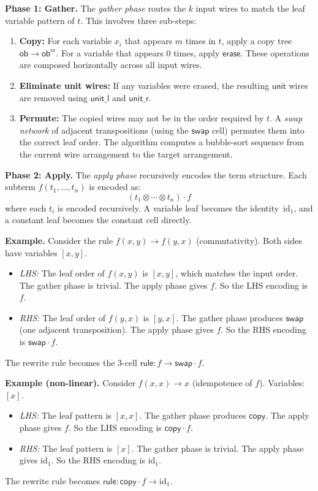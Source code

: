 \documentclass[acmsmall,screen,nonacm]{acmart}
\newcommand{\ob}{\mathsf{ob}}
\newcommand{\unit}{\mathsf{unit}}
\newcommand{\id}{\mathrm{id}}
\newcommand{\copy}{\mathsf{copy}}
\newcommand{\swap}{\mathsf{swap}}
\newcommand{\erase}{\mathsf{erase}}
\begin{document}
\medskip\noindent\textbf{Phase 1: Gather.}
The \emph{gather phase} routes the $k$ input wires to match the leaf
variable pattern of $t$.  This involves three sub-steps:
\begin{enumerate}
\item \textbf{Copy:} For each variable $x_i$ that appears $m$ times in
  $t$, apply a copy tree $\ob \to \ob^m$.  For a variable that appears
  $0$ times, apply $\erase$.  These operations are composed
  horizontally across all input wires.

\item \textbf{Eliminate unit wires:} If any variables were erased, the
  resulting $\unit$ wires are removed using $\mathsf{unit\_l}$ and
  $\mathsf{unit\_r}$.

\item \textbf{Permute:} The copied wires may not be in the order
  required by $t$.  A \emph{swap network} of adjacent transpositions
  (using the $\swap$ cell) permutes them into the correct leaf order.
  The algorithm computes a bubble-sort sequence from the current wire
  arrangement to the target arrangement.
\end{enumerate}

\medskip\noindent\textbf{Phase 2: Apply.}
The \emph{apply phase} recursively encodes the term structure.  Each
subterm $f(t_1, \ldots, t_n)$ is encoded as:
\[
  (t_1 \otimes \cdots \otimes t_n) \cdot f
\]
where each $t_i$ is encoded recursively.  A variable leaf becomes the
identity~$\id_1$, and a constant leaf becomes the constant cell
directly.

\medskip\noindent\textbf{Example.}
Consider the rule $f(x, y) \to f(y, x)$ (commutativity).  Both sides
have variables $[x, y]$.
\begin{itemize}
\item \emph{LHS:} The leaf order of $f(x,y)$ is $[x,y]$, which matches
  the input order.  The gather phase is trivial.  The apply phase gives
  $f$.  So the LHS encoding is $f$.
\item \emph{RHS:} The leaf order of $f(y,x)$ is $[y,x]$.  The gather
  phase produces $\swap$ (one adjacent transposition).  The apply phase
  gives $f$.  So the RHS encoding is $\swap \cdot f$.
\end{itemize}
The rewrite rule becomes the $3$-cell $\mathsf{rule} : f \to \swap
\cdot f$.

\medskip\noindent\textbf{Example (non-linear).}
Consider $f(x, x) \to x$ (idempotence of $f$).  Variables: $[x]$.
\begin{itemize}
\item \emph{LHS:} The leaf pattern is $[x, x]$.  The gather phase
  produces $\copy$.  The apply phase gives $f$.  So the LHS encoding is
  $\copy \cdot f$.
\item \emph{RHS:} The leaf pattern is $[x]$.  The gather phase is
  trivial.  The apply phase gives $\id_1$.  So the RHS encoding is
  $\id_1$.
\end{itemize}
The rewrite rule becomes $\mathsf{rule} : \copy \cdot f \to \id_1$.
\end{document}
